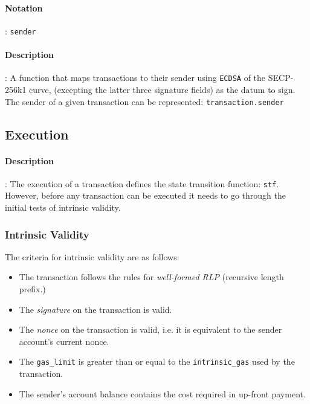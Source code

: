 \documentclass[10pt,a4paper,leqno,bibliography=totoc]{scrartcl}
\newenvironment{alphafootnotes}
{\par\edef\savedfootnotenumber{\number\value{footnote}}
\renewcommand{\thefootnote}{\alph{footnote}}
\setcounter{footnote}{0}}
{\par\setcounter{footnote}{\savedfootnotenumber}}
\begin{document}
\begin{alphafootnotes}
\begin{multicols*}{2}
\paragraph{Notation}: \texttt{sender}
\paragraph{Description}: A function that maps transactions to their sender using \texttt{ECDSA} of the SECP-256k1 curve, (excepting the latter three signature fields) as the datum to sign. The sender of a given transaction can be represented:
\texttt{transaction.sender}

		\subsection{Execution}
			\paragraph{Description}: The execution of a transaction defines the state transition function: \texttt{stf}. However, before any transaction can be executed it needs to go through the initial tests of intrinsic validity. 
			\subsubsection{Intrinsic Validity}
				The criteria for intrinsic validity are as follows:
				\begin{itemize}
				\item The transaction follows the rules for \textsl{well-formed RLP} (recursive length prefix.)
				\item The \textsl{signature} on the transaction is valid.
				\item The \textsl{nonce} on the transaction is valid, i.e. it is equivalent to the sender account's current nonce.
				\item The \texttt{gas\_limit} is greater than or equal to the \texttt{intrinsic\_gas} used by the transaction.
				\item The sender's account balance contains the cost required in up-front payment.
				\end{itemize}


\end{multicols*}
\end{alphafootnotes}
\end{document}
